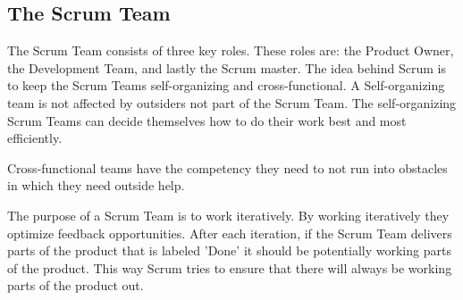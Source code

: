 \subsection{The Scrum Team}


The Scrum Team consists of three key roles. These roles are: the Product Owner, the 
Development Team, and lastly the Scrum master\cite{scrumguide11}. The idea behind Scrum is 
to keep the Scrum Teams self-organizing and cross-functional. A Self-organizing team is not 
affected by outsiders not part of the Scrum Team\cite{scrumguide11}. The self-organizing 
Scrum Teams can decide themselves how to do their work best and most 
efficiently\cite{scrumguide11}. 

Cross-functional teams have the competency they need to not run into obstacles in which they
need outside help\cite{scrumguide11}.


The purpose of a Scrum Team is to work iteratively\cite{scrumguide11}. By working
iteratively they optimize feedback opportunities\cite{scrumguide11}. After each iteration,
if the Scrum Team delivers parts of the product that is labeled 'Done' it should be
potentially working parts of the product\cite{scrumguide11}. This way Scrum tries to ensure
that there will always be working parts of the product out\cite{scrumguide11}.



